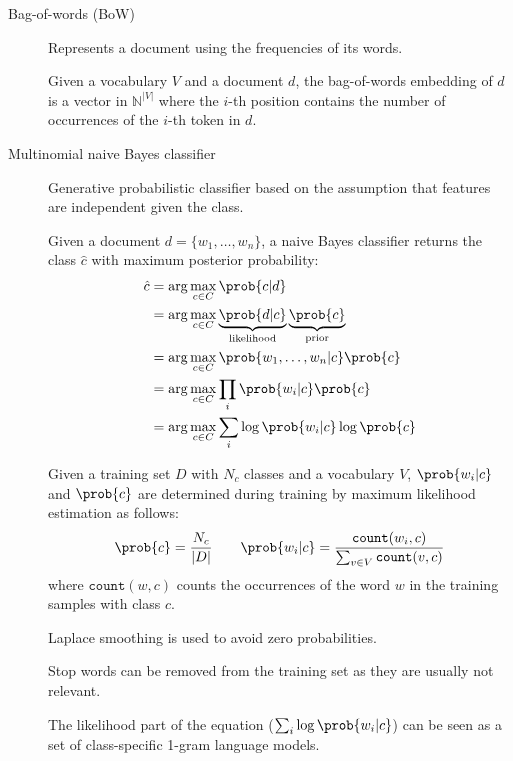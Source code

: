 \begin{description}
    \item[Bag-of-words (BoW)] 
        Represents a document using the frequencies of its words.

        Given a vocabulary $V$ and a document $d$, the bag-of-words embedding of $d$ is a vector in $\mathbb{N}^{\vert V \vert}$ where the $i$-th position contains the number of occurrences of the $i$-th token in $d$.

    \item[Multinomial naive Bayes classifier] 
        Generative probabilistic classifier based on the assumption that features are independent given the class.

        Given a document $d = \{ w_1, \dots, w_n \}$, a naive Bayes classifier returns the class $\hat{c}$ with maximum posterior probability:
        \[
            \begin{split}
                \hat{c} &= \arg\max_{c \in C} \prob{c | d} \\
                &= \arg\max_{c \in C} \underbrace{\prob{d | c}}_{\text{likelihood}} \underbrace{\prob{c}}_{\text{prior}} \\
                &= \arg\max_{c \in C} \prob{w_1, \dots, w_n | c} \prob{c} \\
                &= \arg\max_{c \in C} \prod_{i} \prob{w_i | c} \prob{c} \\
                &= \arg\max_{c \in C} \sum_{i} \log\prob{w_i | c} \log\prob{c} \\
            \end{split}
        \]

        Given a training set $D$ with $N_c$ classes and a vocabulary $V$, $\prob{w_i | c}$ and $\prob{c}$ are determined during training by maximum likelihood estimation as follows:
        \[
            \prob{c} = \frac{N_c}{\vert D \vert}
            \qquad
            \prob{w_i | c} = \frac{\texttt{count}(w_i, c)}{\sum_{v \in V} \texttt{count}(v, c)}
        \]
        where $\texttt{count}(w, c)$ counts the occurrences of the word $w$ in the training samples with class $c$.

        \begin{remark}
            Laplace smoothing is used to avoid zero probabilities.
        \end{remark}

        \begin{remark}
            Stop words can be removed from the training set as they are usually not relevant.
        \end{remark}

        \begin{remark}
            The likelihood part of the equation ($\sum_{i} \log\prob{w_i | c}$) can be seen as a set of class-specific 1-gram language models.
        \end{remark}
\end{description}

